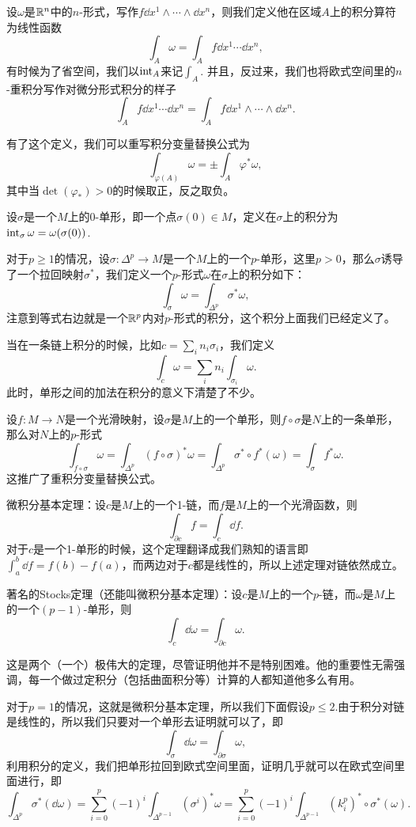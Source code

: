 \para 设$\omega$是$\mathbb{R}^n$中的$n$-形式，写作$f\dd x^1\wedge\cdots\wedge \dd x^n$，则我们定义他在区域$A$上的积分算符为线性函数
\[
	\int_A \omega=\int_A f \dd x^1\cdots\dd x^n,
\]
有时候为了省空间，我们以$\operatorname{int}_A$来记$\int_A$. 并且，反过来，我们也将欧式空间里的$n$-重积分写作对微分形式积分的样子
\[
	\int_A f \dd x^1\cdots\dd x^n=\int_A f\dd x^1\wedge\cdots\wedge \dd x^n.
\]

有了这个定义，我们可以重写积分变量替换公式为
\[
	\int_{\varphi(A)}\omega=\pm\int_A \varphi^*\omega,
\]
其中当$\det(\varphi_*)>0$的时候取正，反之取负。

\para 设$\sigma$是一个$M$上的0-单形，即一个点$\sigma(0)\in M$，定义在$\sigma$上的积分为$\operatorname{int}_\sigma \omega=\omega(\sigma(0))$.

对于$p\geq 1$的情况，设$\sigma:\Delta^p\to M$是一个$M$上的一个$p$-单形，这里$p>0$，那么$\sigma$诱导了一个拉回映射$\sigma^*$，我们定义一个$p$-形式$\omega$在$\sigma$上的积分如下：
\[
	\int_\sigma \omega=\int_{\Delta^p} \sigma^*\omega,
\]
注意到等式右边就是一个$\mathbb{R}^{p}$内对$p$-形式的积分，这个积分上面我们已经定义了。

当在一条链上积分的时候，比如$c=\sum_{i} n_i \sigma_i$，我们定义
\[
	\int_c \omega=\sum_i n_i \int_{\sigma_i} \omega.
\]
此时，单形之间的加法在积分的意义下清楚了不少。

\para 设$f:M\to N$是一个光滑映射，设$\sigma$是$M$上的一个单形，则$f\circ \sigma$是$N$上的一条单形，那么对$N$上的$p$-形式
\[
	\int_{f\circ\sigma} \omega = \int_{\Delta^p}(f\circ \sigma)^*\omega= \int_{\Delta^p}\sigma^*\circ f^*(\omega)=\int_{\sigma}f^*\omega.
\]
这推广了重积分变量替换公式。

\theo 微积分基本定理：设$c$是$M$上的一个1-链，而$f$是$M$上的一个光滑函数，则
\[
	\int_{\partial c} f=\int_c \dd f.
\]
对于$c$是一个1-单形的时候，这个定理翻译成我们熟知的语言即$\int_a^b \dd f=f(b)-f(a)$，而两边对于$c$都是线性的，所以上述定理对链依然成立。

\theo 著名的Stocks定理（还能叫微积分基本定理）：设$c$是$M$上的一个$p$-链，而$\omega$是$M$上的一个$(p-1)$-单形，则
\[
	\int_c \dd \omega=\int_{\partial c} \omega.
\]

这是两个（一个）极伟大的定理，尽管证明他并不是特别困难。他的重要性无需强调，每一个做过定积分（包括曲面积分等）计算的人都知道他多么有用。

\proof 对于$p=1$的情况，这就是微积分基本定理，所以我们下面假设$p\leq 2$.由于积分对链是线性的，所以我们只要对一个单形去证明就可以了，即
\[
	\int_{\sigma} \dd \omega=\int_{\partial \sigma} \omega,
\]
利用积分的定义，我们把单形拉回到欧式空间里面，证明几乎就可以在欧式空间里面进行，即
\[
	\int_{\Delta^p} \sigma^*(\dd \omega)=\sum_{i=0}^p(-1)^i\int_{\Delta^{p-1}} (\sigma^i)^*\omega=\sum_{i=0}^p(-1)^i\int_{\Delta^{p-1}} (k^p_i)^*\circ \sigma^*(\omega).
\]

